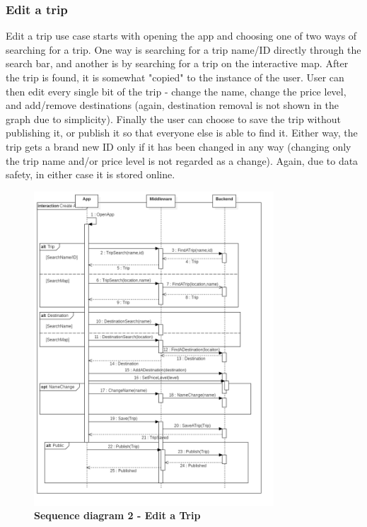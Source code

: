 \subsubsection{Edit a trip}

\hspace{\parindent}Edit a trip use case starts with opening the app and choosing one of two ways of searching for a trip. One way is searching for a trip name/ID directly through the search bar, and another is by searching for a trip on the interactive map. After the trip is found, it is somewhat "copied" to the instance of the user. User can then edit every single bit of the trip - change the name, change the price level, and add/remove destinations (again, destination removal is not shown in the graph due to simplicity). Finally the user can choose to save the trip without publishing it, or publish it so that everyone else is able to find it. Either way, the trip gets a brand new ID only if it has been changed in any way (changing only the trip name and/or price level is not regarded as a change). Again, due to data safety, in either case it is stored online.\\
\begin{figure}[!htb]
\centering
\includegraphics[width=0.8\textwidth]{../Graphs/Sequence2_Edit_A_Trip.png}
\caption{\label{fig:dbapiuser}\textbf{Sequence diagram 2 - Edit a Trip}}
\end{figure}
\newpage
